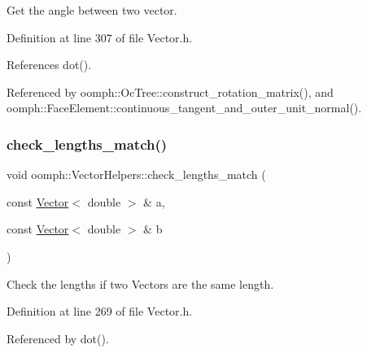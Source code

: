 Get the angle between two vector. 



Definition at line 307 of file Vector.\+h.



References dot().



Referenced by oomph\+::\+Oc\+Tree\+::construct\+\_\+rotation\+\_\+matrix(), and oomph\+::\+Face\+Element\+::continuous\+\_\+tangent\+\_\+and\+\_\+outer\+\_\+unit\+\_\+normal().

\mbox{\label{namespaceoomph_1_1VectorHelpers_adf5dc760c5f0c03365628b293544f838}} 
\subsubsection{\texorpdfstring{check\+\_\+lengths\+\_\+match()}{check\_lengths\_match()}}
{\footnotesize\ttfamily void oomph\+::\+Vector\+Helpers\+::check\+\_\+lengths\+\_\+match (\begin{DoxyParamCaption}\item[{const \hyperlink{classoomph_1_1Vector}{Vector}$<$ double $>$ \&}]{a,  }\item[{const \hyperlink{classoomph_1_1Vector}{Vector}$<$ double $>$ \&}]{b }\end{DoxyParamCaption})\hspace{0.3cm}{\ttfamily [inline]}}



Check the lengths if two Vectors are the same length. 



Definition at line 269 of file Vector.\+h.



Referenced by dot().

\mbox{\label{namespaceoomph_1_1VectorHelpers_a462a66b178a1be39913a4b62c9d72eda}} 
